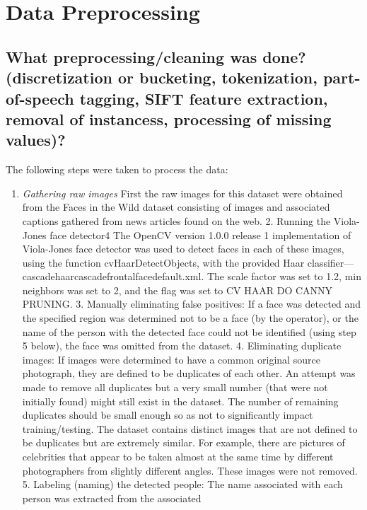 \section*{Data Preprocessing}
\subsection*{What preprocessing/cleaning was done? (\eg discretization or bucketing, tokenization, part-of-speech tagging, SIFT feature extraction, removal of instancess, processing of missing values)?}
\noindent The following steps were taken to process the data:
\begin{enumerate}

\item \emph{Gathering raw images} First the raw images for this
dataset were obtained from the Faces in the Wild dataset
consisting of images and associated captions gathered from
news articles found on the web.
2. Running the Viola-Jones face detector4 The OpenCV version 1.0.0 release 1 implementation of Viola-Jones face detector was used to detect faces in each of these images, using
the function cvHaarDetectObjects, with the provided Haar
classifier—cascadehaarcascadefrontalfacedefault.xml. The
scale factor was set to 1.2, min neighbors was set to 2, and
the flag was set to CV HAAR DO CANNY PRUNING.
3. Manually eliminating false positives: If a face was detected and the specified region was determined not to be a
face (by the operator), or the name of the person with the
detected face could not be identified (using step 5 below),
the face was omitted from the dataset.
4. Eliminating duplicate images: If images were determined
to have a common original source photograph, they are defined to be duplicates of each other. An attempt was made to
remove all duplicates but a very small number (that were not
initially found) might still exist in the dataset. The number
of remaining duplicates should be small enough so as not
to significantly impact training/testing. The dataset contains
distinct images that are not defined to be duplicates but are
extremely similar. For example, there are pictures of celebrities that appear to be taken almost at the same time by different photographers from slightly different angles. These
images were not removed.
5. Labeling (naming) the detected people: The name associated with each person was extracted from the associated
\end{enumerate}

